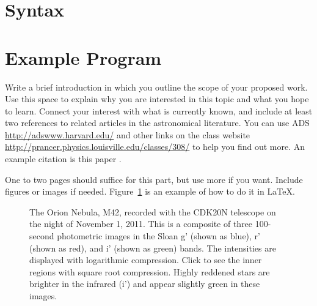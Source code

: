 \documentclass[dvips,12pt]{article}
\begin{document}
\section{Syntax}

\section{Example Program}

\begin{XMLlisting}[tabsize=4]

\end{XMLlisting}

\begin{XMLlisting}[tabsize=4]

\end{XMLlisting}

\iffalse

Write a brief introduction in which you  outline the scope of your proposed
work. Use this space to explain why you are interested in this topic and what
you hope to learn. Connect your interest with what is currently known, and
include at least two references to related articles in the astronomical
literature.  You can use ADS  \url{http://adswww.harvard.edu/} and other links
on the class website \url{http://prancer.physics.louisville.edu/classes/308/} 
to help you find out more. An example citation is this paper
\cite{gonzalez2012}.

One to two pages should suffice for this part, but use more if you want.  
Include figures or images if needed.  Figure~\ref{m42} is an example of  how to
do it in \LaTeX.


\begin{figure}
\begin{center}
\end{center}

\caption{The Orion Nebula, M42, recorded with the CDK20N telescope on the night
of November 1, 2011. This is a composite of three 100-second photometric images
in the Sloan g' (shown as blue), r' (shown as red), and i' (shown as green)
bands. The intensities are displayed with logarithmic compression. Click to see
the inner regions with square root compression. Highly reddened stars are
brighter in the infrared (i') and appear slightly green in these images.
\label{m42}}

\end{figure}
\end{document}

